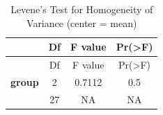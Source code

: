 \documentclass[]{article}
\begin{document}
\begin{longtable}[]{@{}cccc@{}}
\caption{Levene's Test for Homogeneity of Variance (center =
mean)}\tabularnewline
\toprule
\begin{minipage}[b]{0.15\columnwidth}\centering\strut
~\strut
\end{minipage} & \begin{minipage}[b]{0.06\columnwidth}\centering\strut
Df\strut
\end{minipage} & \begin{minipage}[b]{0.12\columnwidth}\centering\strut
F value\strut
\end{minipage} & \begin{minipage}[b]{0.12\columnwidth}\centering\strut
Pr(\textgreater{}F)\strut
\end{minipage}\tabularnewline
\midrule
\endfirsthead
\toprule
\begin{minipage}[b]{0.15\columnwidth}\centering\strut
~\strut
\end{minipage} & \begin{minipage}[b]{0.06\columnwidth}\centering\strut
Df\strut
\end{minipage} & \begin{minipage}[b]{0.12\columnwidth}\centering\strut
F value\strut
\end{minipage} & \begin{minipage}[b]{0.12\columnwidth}\centering\strut
Pr(\textgreater{}F)\strut
\end{minipage}\tabularnewline
\midrule
\endhead
\begin{minipage}[t]{0.15\columnwidth}\centering\strut
\textbf{group}\strut
\end{minipage} & \begin{minipage}[t]{0.06\columnwidth}\centering\strut
2\strut
\end{minipage} & \begin{minipage}[t]{0.12\columnwidth}\centering\strut
0.7112\strut
\end{minipage} & \begin{minipage}[t]{0.12\columnwidth}\centering\strut
0.5\strut
\end{minipage}\tabularnewline
\begin{minipage}[t]{0.15\columnwidth}\centering\strut
\strut
\end{minipage} & \begin{minipage}[t]{0.06\columnwidth}\centering\strut
27\strut
\end{minipage} & \begin{minipage}[t]{0.12\columnwidth}\centering\strut
NA\strut
\end{minipage} & \begin{minipage}[t]{0.12\columnwidth}\centering\strut
NA\strut
\end{minipage}\tabularnewline
\bottomrule
\end{longtable}
\end{document}
